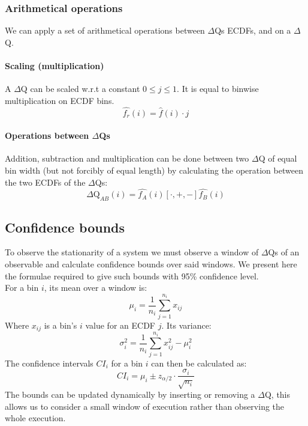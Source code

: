     \subsubsection{Arithmetical operations}
        We can apply a set of arithmetical operations between $\Delta$Qs ECDFs, and on a $\Delta$Q.
    \paragraph{Scaling (multiplication)} A $\Delta$Q can be scaled w.r.t a constant $0 \le j \le 1$. It is equal to binwise multiplication on ECDF bins.
    \begin{equation}
        \hat{f_r}(i) = \hat{f}(i) \cdot j
        \label{eq:mul_ecdf}
    \end{equation}

    \paragraph{Operations between $\Delta$Qs} 
        Addition, subtraction and multiplication can be done between two $\Delta$Q of equal bin width (but not forcibly of equal length) by calculating the operation between the two ECDFs of the $\Delta$Qs:
        \begin{equation}
            \Delta \text{Q}_{AB}(i) = \hat{f_A}(i) [\cdot, +, -] \hat{f_B}(i)
            \label{eq:op_dq}
        \end{equation}
\subsection{Confidence bounds}
    To observe the stationarity of a system we must observe a window of $\Delta$Qs of an observable and calculate confidence bounds over said windows. We present here the formulae required to give such bounds with 95\% confidence level. \\
        For a bin $i$, its mean over a window is:
            \begin{equation}
                \mu_i = \dfrac{1}{n_i} \sum_{j=1}^{n_i} x_{ij}
                \label{eq:mean_ecdf}
            \end{equation}
        Where $x_{ij}$ is a bin's $i$ value for an ECDF $j$.
        Its variance:
            \begin{equation}
                \sigma^2_i = \dfrac{1}{n_i} \sum_{j=1}^{n_i} x^2_{ij} - \mu^2_i
                \label{eq:var_ecdf}
            \end{equation}
        The confidence intervals $CI_i$ for a bin $i$ can then be calculated as:
        \begin{equation}
            CI_i = \mu_i \pm z_{\alpha/2} \cdot \dfrac{\sigma_i}{\sqrt{n_i}}      
            \label{eq:ci_i}
        \end{equation}
    The bounds can be updated dynamically by inserting or removing a $\Delta$Q, this allows us to consider a small window of execution rather than observing the whole execution.
